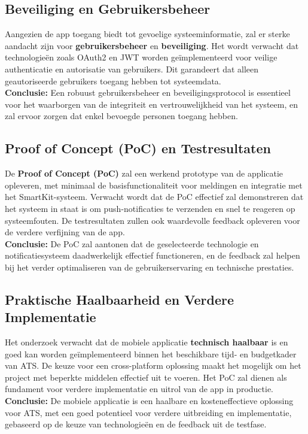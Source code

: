 \subsection{Beveiliging en Gebruikersbeheer}
Aangezien de app toegang biedt tot gevoelige systeeminformatie, zal er sterke aandacht zijn voor \textbf{gebruikersbeheer} en \textbf{beveiliging}. Het wordt verwacht dat technologieën zoals OAuth2 en JWT worden geïmplementeerd voor veilige authenticatie en autorisatie van gebruikers. Dit garandeert dat alleen geautoriseerde gebruikers toegang hebben tot systeemdata.
\\
\textbf{Conclusie:} Een robuust gebruikersbeheer en beveiligingsprotocol is essentieel voor het waarborgen van de integriteit en vertrouwelijkheid van het systeem, en zal ervoor zorgen dat enkel bevoegde personen toegang hebben.

\subsection{Proof of Concept (PoC) en Testresultaten}
De \textbf{Proof of Concept (PoC)} zal een werkend prototype van de applicatie opleveren, met minimaal de basisfunctionaliteit voor meldingen en integratie met het SmartKit-systeem. Verwacht wordt dat de PoC effectief zal demonstreren dat het systeem in staat is om push-notificaties te verzenden en snel te reageren op systeemfouten. De testresultaten zullen ook waardevolle feedback opleveren voor de verdere verfijning van de app.
\\
\textbf{Conclusie:} De PoC zal aantonen dat de geselecteerde technologie en notificatiesysteem daadwerkelijk effectief functioneren, en de feedback zal helpen bij het verder optimaliseren van de gebruikerservaring en technische prestaties.

\subsection{Praktische Haalbaarheid en Verdere Implementatie}
Het onderzoek verwacht dat de mobiele applicatie \textbf{technisch haalbaar} is en goed kan worden geïmplementeerd binnen het beschikbare tijd- en budgetkader van ATS. De keuze voor een cross-platform oplossing maakt het mogelijk om het project met beperkte middelen effectief uit te voeren. Het PoC zal dienen als fundament voor verdere implementatie en uitrol van de app in productie.
\\
\textbf{Conclusie:} De mobiele applicatie is een haalbare en kosteneffectieve oplossing voor ATS, met een goed potentieel voor verdere uitbreiding en implementatie, gebaseerd op de keuze van technologieën en de feedback uit de testfase.


